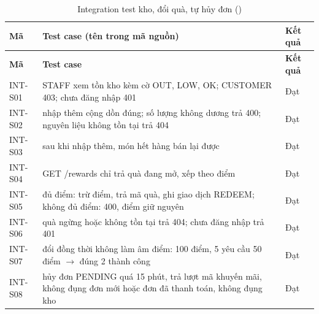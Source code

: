 {\small
\begin{longtable}{@{}L{1.9cm}L{10.6cm}L{1.3cm}@{}}
\caption{Integration test kho, đổi quà, tự hủy đơn ()}\label{tab:ints}\\
\toprule
\textbf{Mã} & \textbf{Test case (tên trong mã nguồn)} & \textbf{Kết quả} \\ \midrule \endfirsthead
\toprule \textbf{Mã} & \textbf{Test case} & \textbf{Kết quả} \\ \midrule \endhead
\bottomrule \endfoot
INT-S01 & STAFF xem tồn kho kèm cờ OUT, LOW, OK; CUSTOMER 403; chưa đăng nhập 401 & Đạt \\
INT-S02 & nhập thêm cộng dồn đúng; số lượng không dương trả 400; nguyên liệu không tồn tại trả 404 & Đạt \\
INT-S03 & sau khi nhập thêm, món hết hàng bán lại được & Đạt \\
INT-S04 & GET /rewards chỉ trả quà đang mở, xếp theo điểm & Đạt \\
INT-S05 & đủ điểm: trừ điểm, trả mã quà, ghi giao dịch REDEEM; không đủ điểm: 400, điểm giữ nguyên & Đạt \\
INT-S06 & quà ngừng hoặc không tồn tại trả 404; chưa đăng nhập trả 401 & Đạt \\
INT-S07 & đổi đồng thời không làm âm điểm: 100 điểm, 5 yêu cầu 50 điểm $\rightarrow$ đúng 2 thành công & Đạt \\
INT-S08 & hủy đơn PENDING quá 15 phút, trả lượt mã khuyến mãi, không đụng đơn mới hoặc đơn đã thanh toán, không đụng kho & Đạt \\
\end{longtable}
}